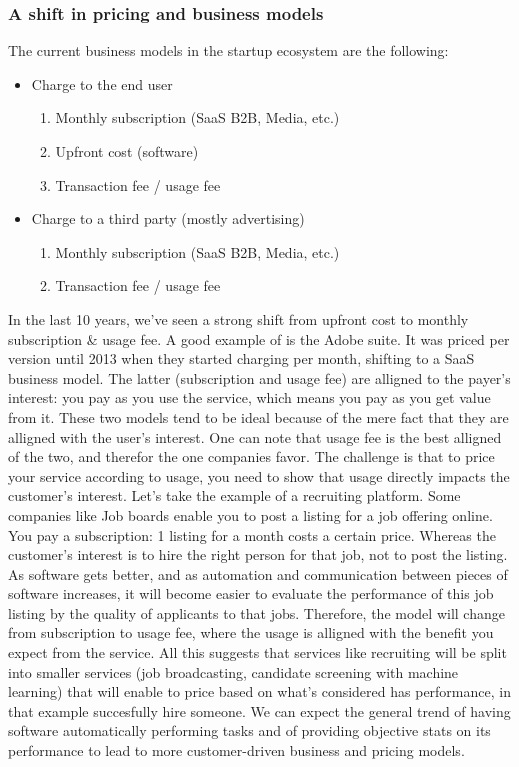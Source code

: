 \documentclass[12pt]{article}
\begin{document}
\subsubsection{A shift in pricing and business models}
The current business models in the startup ecosystem are the following:
\begin{itemize}
  \item Charge to the end user
  \begin{enumerate}
    \item Monthly subscription (SaaS B2B, Media, etc.)
    \item Upfront cost (software)
    \item Transaction fee / usage fee
  \end{enumerate}
  \item Charge to a third party (mostly advertising)
  \begin{enumerate}
    \item Monthly subscription (SaaS B2B, Media, etc.)
    \item Transaction fee / usage fee
  \end{enumerate}
\end{itemize}

In the last 10 years, we've seen a strong shift from upfront cost to monthly subscription \& usage fee. A good example of is the Adobe suite. It was priced per version until 2013 when they started charging per month, shifting to a SaaS business model.
The latter (subscription and usage fee) are alligned to the payer's interest: you pay as you use the service, which means you pay as you get value from it. These two models tend to be ideal because of the mere fact that they are alligned with the user's interest. One can note that usage fee is the best alligned of the two, and therefor the one companies favor.
The challenge is that to price your service according to usage, you need to show that usage directly impacts the customer's interest. Let's take the example of a recruiting platform. Some companies like Job boards enable you to post a listing for a job offering online. You pay a subscription: 1 listing for a month costs a certain price. Whereas the customer's interest is to hire the right person for that job, not to post the listing. As software gets better, and as automation and communication between pieces of software increases, it will become easier to evaluate the performance of this job listing by the quality of applicants to that jobs. Therefore, the model will change from subscription to usage fee, where the usage is alligned with the benefit you expect from the service.
All this suggests that services like recruiting will be split into smaller services (job broadcasting, candidate screening with machine learning) that will enable to price based on what's considered has performance, in that example succesfully hire someone. We can expect the general trend of having software automatically performing tasks and of providing objective stats on its performance to lead to more customer-driven business and pricing models.
\end{document}
